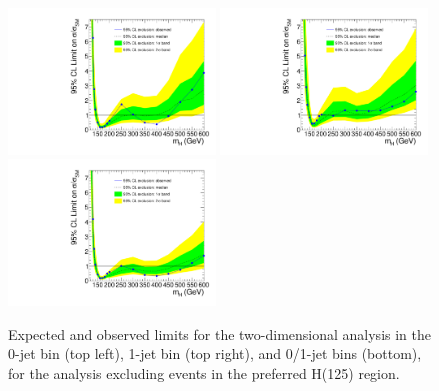 \begin{figure}[hbt]
\begin{center}
  \includegraphics[width=0.49\textwidth]{figures/limits8TeV_ofshape0_HCP_2D_NoH125.pdf}
  \includegraphics[width=0.49\textwidth]{figures/limits8TeV_ofshape1_HCP_2D_NoH125.pdf}
  \includegraphics[width=0.49\textwidth]{figures/limits8TeV_ofshape_HCP_2D_NoH125.pdf}
\caption{\label{fig:limits8TeV_ofshapeN_HCP_2D_NoH125}\protect Expected and observed limits for the two-dimensional 
analysis in the 0-jet bin (top left), 1-jet bin (top right), and 0/1-jet bins (bottom), for 
the analysis excluding events in the preferred H(125) region.}
\end{center}
\end{figure}

